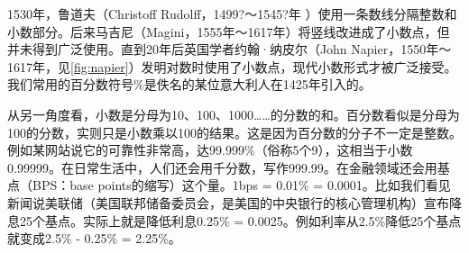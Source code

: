 \documentclass[b5paper]{ctexart}
\begin{document}
\begin{figure}[htbp]
 \centering
  \quad
\end{figure}

1530年，鲁道夫（Christoff Rudolff，1499?～1545?年 ）使用一条数线分隔整数和小数部分。后来马吉尼（Magini，1555年～1617年）将竖线改进成了小数点，但并未得到广泛使用。直到20年后英国学者约翰·纳皮尔（John Napier，1550年～1617年，见\cref{fig:napier}）发明对数时使用了小数点，现代小数形式才被广泛接受。我们常用的百分数符号\%是佚名的某位意大利人在1425年引入的。

从另一角度看，小数是分母为10、100、1000……的分数的和。百分数看似是分母为100的分数，实则只是小数乘以100的结果。这是因为百分数的分子不一定是整数。例如某网站说它的可靠性非常高，达99.999\%（俗称5个9），这相当于小数0.99999。在日常生活中，人们还会用千分数，写作999.99\textperthousand。在金融领域还会用基点（BPS：base points的缩写）这个量。1bps = 0.01\% = 0.0001。比如我们看见新闻说美联储（美国联邦储备委员会，是美国的中央银行的核心管理机构）宣布降息25个基点。实际上就是降低利息0.25\% = 0.0025。例如利率从2.5\%降低25个基点就变成2.5\% - 0.25\% = 2.25\%。
\end{document}
